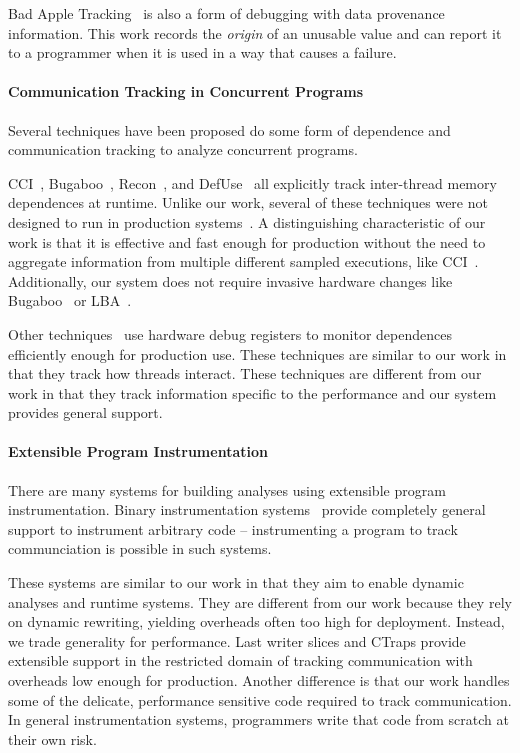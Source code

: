 \documentclass[preprint,9pt]{sigplanconf}
\newcommand{\ctraps}{CTraps\xspace}
\begin{document}
Bad Apple Tracking~\cite{badapples} is also a form of debugging with data
provenance information. This work records the {\em origin} of an unusable value
and can report it to a programmer when it is used in a way that causes a
failure.

\paragraph{Communication Tracking in Concurrent Programs}
Several techniques have been proposed do some form of dependence and
communication tracking to analyze concurrent programs.  

CCI~\cite{cci}, Bugaboo~\cite{bugaboo}, Recon~\cite{recon}, and
DefUse~\cite{defuse} all explicitly track inter-thread memory dependences at
runtime.  Unlike our work, several of these techniques were not designed to run
in production systems~\cite{recon,defuse}.  A distinguishing characteristic of
our work is that it is effective and fast enough for production without the
need to aggregate information from multiple different sampled executions, like
CCI~\cite{cci}.  Additionally, our system does not require invasive hardware
changes like Bugaboo~\cite{bugaboo} or LBA~\cite{paralog}.

Other techniques~\cite{threadclustering,threadcriticality} use  hardware debug
registers to monitor dependences efficiently enough for production use.  These
techniques are similar to our work in that they track how threads interact.
These techniques are different from our work in that they track information
specific to the performance and our system provides general support.

\paragraph{Extensible Program Instrumentation}
There are many systems for building analyses using extensible program
instrumentation.  Binary instrumentation
systems~\cite{pin,dynamorio,valgrind,roadrunner} provide completely general
support to instrument arbitrary code -- instrumenting a program to track
communciation is possible in such systems.  

These systems are similar to our work in that they aim to enable dynamic
analyses and runtime systems.  They are different from our work because they
rely on dynamic rewriting, yielding overheads often too high for deployment.
Instead, we trade generality for performance. Last writer slices and \ctraps
provide extensible support in the restricted domain of tracking communication
with overheads low enough for production.  Another difference is that our work
handles some of the delicate, performance sensitive code required to track
communication.  In general instrumentation systems, programmers write that code
from scratch at their own risk.  
\end{document}
